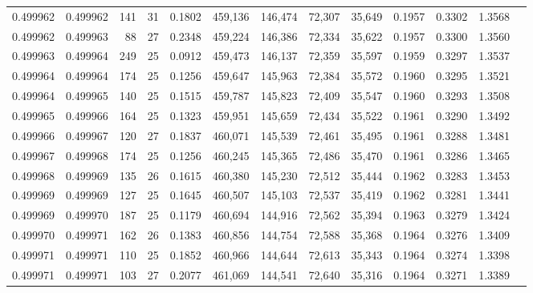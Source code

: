 \begin{tabular}{rrrrrrrrrrrrr}
0.499962 & 0.499962 & 141 &  31 &                                     0.1802 & 459,136 & 146,474 &  72,307 &  35,649 & 0.1957 & 0.3302 & 1.3568 \\
0.499962 & 0.499963 &  88 &  27 &                                     0.2348 & 459,224 & 146,386 &  72,334 &  35,622 & 0.1957 & 0.3300 & 1.3560 \\
0.499963 & 0.499964 & 249 &  25 &                                     0.0912 & 459,473 & 146,137 &  72,359 &  35,597 & 0.1959 & 0.3297 & 1.3537 \\
0.499964 & 0.499964 & 174 &  25 &                                     0.1256 & 459,647 & 145,963 &  72,384 &  35,572 & 0.1960 & 0.3295 & 1.3521 \\
0.499964 & 0.499965 & 140 &  25 &                                     0.1515 & 459,787 & 145,823 &  72,409 &  35,547 & 0.1960 & 0.3293 & 1.3508 \\
0.499965 & 0.499966 & 164 &  25 &                                     0.1323 & 459,951 & 145,659 &  72,434 &  35,522 & 0.1961 & 0.3290 & 1.3492 \\
0.499966 & 0.499967 & 120 &  27 &                                     0.1837 & 460,071 & 145,539 &  72,461 &  35,495 & 0.1961 & 0.3288 & 1.3481 \\
0.499967 & 0.499968 & 174 &  25 &                                     0.1256 & 460,245 & 145,365 &  72,486 &  35,470 & 0.1961 & 0.3286 & 1.3465 \\
0.499968 & 0.499969 & 135 &  26 &                                     0.1615 & 460,380 & 145,230 &  72,512 &  35,444 & 0.1962 & 0.3283 & 1.3453 \\
0.499969 & 0.499969 & 127 &  25 &                                     0.1645 & 460,507 & 145,103 &  72,537 &  35,419 & 0.1962 & 0.3281 & 1.3441 \\
0.499969 & 0.499970 & 187 &  25 &                                     0.1179 & 460,694 & 144,916 &  72,562 &  35,394 & 0.1963 & 0.3279 & 1.3424 \\
0.499970 & 0.499971 & 162 &  26 &                                     0.1383 & 460,856 & 144,754 &  72,588 &  35,368 & 0.1964 & 0.3276 & 1.3409 \\
0.499971 & 0.499971 & 110 &  25 &                                     0.1852 & 460,966 & 144,644 &  72,613 &  35,343 & 0.1964 & 0.3274 & 1.3398 \\
0.499971 & 0.499971 & 103 &  27 &                                     0.2077 & 461,069 & 144,541 &  72,640 &  35,316 & 0.1964 & 0.3271 & 1.3389 \\

\end{tabular}
